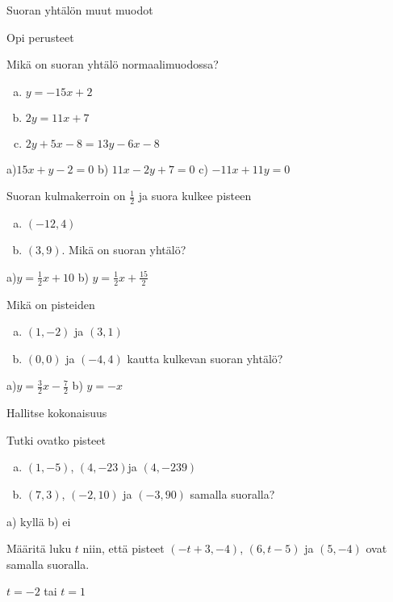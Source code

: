 Suoran yhtälön muut muodot

Opi perusteet

\begin{tehtava}
Mikä on suoran yhtälö normaalimuodossa?
\begin{enumerate}[a)]
\item $y=-15x+2$
\item $2y=11x+7$
\item $2y+5x-8=13y-6x-8$
\end{enumerate}
\begin{vastaus}
a)$15x+y-2=0$ b) $11x-2y+7=0$ c) $-11x+11y=0$
\end{vastaus}
\end{tehtava}


\begin{tehtava}
Suoran kulmakerroin on $\frac{1}{2}$ ja suora kulkee pisteen
\begin{enumerate}[a)]
\item $(-12,4)$
\item $(3,9)$. Mikä on suoran yhtälö?
\end{enumerate}
\begin{vastaus}
a)$y=\frac{1}{2}x+10$ b) $y=\frac{1}{2}x+\frac{15}{2}$
\end{vastaus}
\end{tehtava}

\begin{tehtava}
Mikä on pisteiden
\begin{enumerate}[a)]
\item $(1,-2)$ ja $(3,1)$
\item $(0,0)$ ja $(-4,4)$ kautta kulkevan suoran yhtälö?
\end{enumerate}
\begin{vastaus}
a)$y=\frac{3}{2}x-\frac{7}{2}$ b) $y=-x$
\end{vastaus}
\end{tehtava}

Hallitse kokonaisuus

\begin{tehtava}
Tutki ovatko pisteet  
\begin{enumerate}[a)]
\item $(1,-5)$, $(4,-23)$ja $(4,-239)$
\item $(7,3)$, $(-2,10)$ ja $(-3,90)$ samalla suoralla?
\end{enumerate}
\begin{vastaus}
a) kyllä b) ei
\end{vastaus}
\end{tehtava}

\begin{tehtava}
Määritä luku $t$ niin, että pisteet $(-t+3,-4)$, $(6,t-5)$ ja $(5,-4)$ ovat samalla suoralla.
\begin{vastaus}
$t=-2$ tai $t=1$
\end{vastaus}
\end{tehtava}
